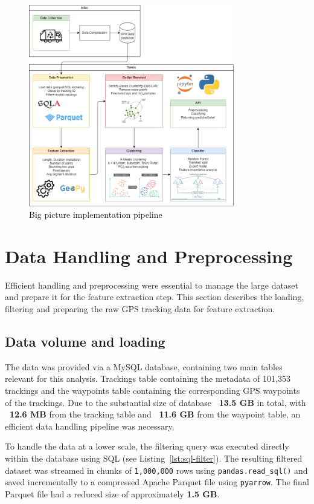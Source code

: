 \documentclass[a4paper,12pt,twoside]{scrreprt}
\begin{document}
\begin{figure}[htbp]
  \centering

  \includegraphics[width=0.8\textwidth]{Diagrams/drawio/big_picture_implementation.png}
  \caption{Big picture implementation pipeline}
  \label{fig:big_picture_implemetation_diagram}
\end{figure}
\FloatBarrier

\section{Data Handling and Preprocessing}
Efficient handling and preprocessing were essential to manage the large dataset
and prepare it for the feature extraction step.
This section describes the loading, filtering and preparing the raw GPS
tracking data for feature extraction.

\subsection{Data volume and loading}

The data was provided via a MySQL database, containing two main tables relevant
for this analysis.
Trackings table containing the metadata of 101,353 trackings and the waypoints
table containing the corresponding GPS waypoints of the trackings.
Due to the substantial size of database \textbf{~13.5 GB} in total, with
\textbf{~12.6 MB} from the tracking table and \textbf{~11.6 GB} from the
waypoint table,
an efficient data handling pipeline was necessary.

To handle the data at a lower scale, the filtering query was executed directly
within the database using SQL (see Listing~\ref{lst:sql-filter}). The resulting
filtered dataset was streamed in chunks of \texttt{1,000,000} rows using
\texttt{pandas.read\_sql()} and saved incrementally to a compressed Apache
Parquet file using \texttt{pyarrow}. The final Parquet file had a reduced size
of approximately \textbf{1.5 GB}.
\end{document}
